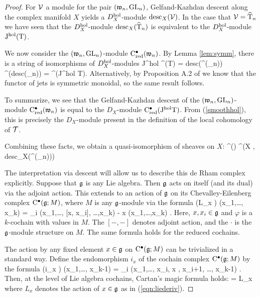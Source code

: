 \documentclass[11pt]{amsart}
\numberwithin{equation}{section}
\def\jet{{\rm J}}
\def\tangent{{\rm T}}
\def\desc{{\rm desc}}
\begin{document}
\begin{proof}
For $\mathcal V$ a module for the pair $(\mathfrak w_n, {\rm GL}_n)$, Gelfand-Kazhdan descent along the complex manifold $X$ yields a $D^{\rm hol}_X$-module $\desc_X(\cV)$. 
In the case that $\cV = \Hat{\tangent}_n$ we have seen that the $D^{\rm hol}_X$-module $\desc_X(\Hat{\tangent}_n)$ is equivalent to the $D^{\rm hol}_X$-module $\jet^{\rm hol} (\tangent)$. 

We now consider the $(\mathfrak w_n, {\rm GL}_n)$-module ${\rm C}_{\rm red}^\bullet(\mathfrak w_n)$. 
By Lemma \ref{lem:symm}, there is a string of isomorphisms of $D^{\rm hol}_X$-modules
\beqn
\jet^{\rm hol} \cred^\bu (\tangent) = \desc(\cred^\bu(\fw_n)) \cong \cred^\bu(\desc(\fw_n)) = \cred^\bu({\rm J}^{\rm hol} \tangent).
\eeqn
Alternatively, by Proposition A.2 of \cite{GG3} we know that the functor of jets is symmetric monoidal, so the same result follows.

To summarize, we see that the Gelfand-Kazhdan descent of the $(\mathfrak w_n, {\rm GL}_n)$-module ${\rm C}_{\rm red}^\bullet(\mathfrak w_n)$ is equal to the $D_X$-module $\cred^\bu(\jet^{\rm hol} \tangent)$.
From (\ref{smoothhol}), this is precisely the $D_X$-module present in the definition of the local cohomology of $\mathcal T$.

Combining these facts, we obtain a quasi-isomorphism of sheaves on $X$:
\beqn
\cloc^\bu(\cT) \; \simeq \; \Omega^\bu\bigg(X , \desc_X\left(\cred^\bu(\fw_n)\right)\bigg)
\eeqn

The interpretation via descent will allow us to describe this de Rham complex explicitly. 
Suppose that $\mathfrak g$ is any Lie algebra.
Then $\mathfrak g$ acts on itself (and its dual) via the adjoint action. 
This extends to an action of $\mathfrak g$ on its Chevalley-Eilenberg complex ${\rm C}^\bullet(\mathfrak g ; M)$, where $M$ is any $\mathfrak g$-module via the formula
\beqn\label{eqn:liederiv}
(L_x \varphi) (x_1,\ldots, x_k) = \sum_i \varphi(x_1,\ldots, [x, x_i], \ldots,x_k) - x \cdot \varphi(x_1,\ldots,x_k) .
\eeqn
Here, $x, x_i \in \mathfrak g$ and $\varphi$ is a $k$-cochain with values in $M$.
The $[-,-]$ denotes adjoint action, and the $\cdot$ is the $\mathfrak g$-module structure on $M$. 
The same formula holds for the reduced cochains.

The action by any fixed element $x\in \mathfrak g$ on ${\rm C}^\bullet(\mathfrak g ; M)$ can be trivialized in a standard way. 
Define the endomorphism $i_x$ of the cochain complex ${\rm C}^\bullet(\mathfrak g ; M)$ by the formula
\beqn
(i_x \varphi) (x_1,\ldots, x_{k-1}) = \sum_i \varphi (x_1,\ldots, x_i, x , x_{i+1}, \ldots, x_{k-1}) .
\eeqn
Then, at the level of Lie algebra cochains, Cartan's magic formula holds:
\beqn
[\d_{\rm CE}, i_x] = L_x
\eeqn
where $L_x$ denotes the action of $x \in \mathfrak g$ as in (\ref{eqn:liederiv}). 


\end{proof}
\end{document}
